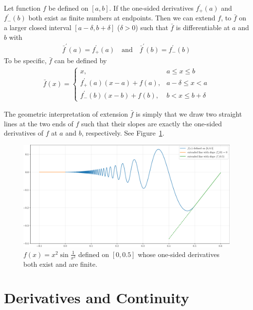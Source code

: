 \documentclass[thmcnt=section, 12pt]{my-elegantbook}
\begin{document}
\begin{lemma} \label{lem:6}
	Let function $f$ be defined on $[a, b]$.
	If the one-sided derivatives $f^\prime_{+}(a)$
	and $f^\prime_{-}(b)$ both exist as finite numbers
	at endpoints.
	Then we can extend $f$, to $\bar{f}$ on a larger 
	closed interval $[a-\delta, b+\delta]$ ($\delta > 0$)
	such that $\bar{f}$ is differentiable at $a$ and $b$
	with
	\begin{align*}
		\bar{f}^\prime(a) = f^\prime_{+}(a)
		\quad \text{and} \quad
		\bar{f}^\prime(b) = f^\prime_{-}(b)
	\end{align*}
	To be specific, $\bar{f}$ can be defined by 
	\begin{align*}
		\bar{f}(x) = 
		\begin{cases}
			x,
			& a \leq x \leq b \\
			f^\prime_{+}(a) (x - a) + f(a),
			& a - \delta \leq x < a \\
			f^\prime_{-}(b) (x - b) + f(b),
			& b < x \leq b + \delta
		\end{cases}
	\end{align*}
\end{lemma}

The geometric interpretation of extension $\bar{f}$ is 
simply that we draw two straight lines at the two ends
of $f$ such that their slopes are exactly
the one-sided derivatives of $f$ at $a$ and $b$, respectively.
See Figure~\ref{fig:16}.

\begin{figure}[ht]
	\centering
	\includegraphics[scale=0.5]{figures/ma-016.png}
	\caption{$f(x) = x^2 \sin \frac{1}{x^2}$ defined on $[0, 0.5]$ whose one-sided derivatives both exist and are finite.}
	\label{fig:16}
\end{figure}


\section{Derivatives and Continuity}
\end{document}
